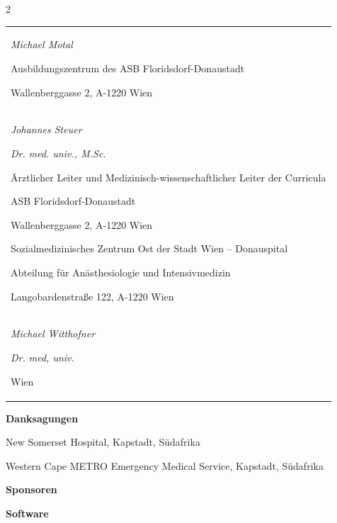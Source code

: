 \documentclass{article}
\begin{document}
\begin{multicols}{2}
\begin{center}
\begin{tabular}{m{6.813cm}}
\\
{\mdseries\itshape Michael Motal}

{\mdseries Ausbildungszentrum des ASB Floridsdorf-Donaustadt}

{\mdseries Wallenberggasse 2, A-1220 Wien}

\\
{\mdseries\itshape Johannes Steuer}

{\mdseries\itshape Dr. med. univ., M.Sc.}

{\mdseries \"Arztlicher Leiter und Medizinisch-wissenschaftlicher Leiter
der Curricula}

{\mdseries ASB Floridsdorf-Donaustadt}

{\mdseries Wallenberggasse 2, A-1220 Wien}

{\mdseries Sozialmedizinisches Zentrum Ost der Stadt Wien --
Donauspital}

{\mdseries Abteilung f\"ur An\"asthesiologie und Intensivmedizin}

{\mdseries Langobardenstra{\ss}e 122, A-1220 Wien}

\\
{\mdseries\itshape Michael Witthofner}

{\mdseries\itshape Dr. med, univ. }

{\mdseries Wien }

\\
\end{tabular}
\end{center}
\end{multicols}
{\bfseries
Danksagungen}

{\mdseries
New Somerset Hospital, Kapstadt, S\"udafrika}

{\mdseries
Western Cape METRO Emergency Medical Service, Kapstadt, S\"udafrika}

{\bfseries
Sponsoren}

{\bfseries
Software}
\end{document}
